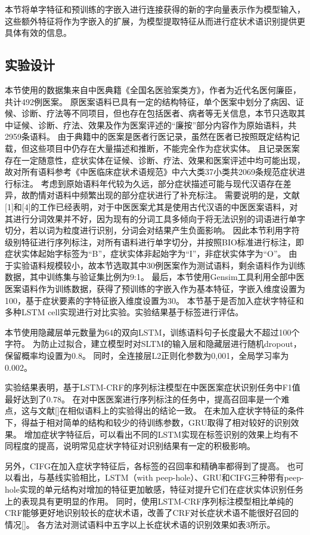 本节将单字特征和预训练的字嵌入进行连接获得的新的字向量表示作为模型输入，这些额外特征将作为字嵌入的扩展，为模型提取特征从而进行症状术语识别提供更具体有效的信息。


\subsection{实验设计}
本节使用的数据集来自中医典籍《全国名医验案类方》，作者为近代名医何廉臣，共计492例医案。
原医案语料已具有一定的结构特征，单个医案中划分了病因、证候、诊断、疗法等不同项目，但也存在包括医者、病者等无关信息，本节只选取其中证候、诊断、疗法、效果及作为医案评述的“廉按”部分内容作为原始语料，共2959条语料。
由于典籍中的医案是医者行医记录，虽然在医者已按照既定结构记载，但这些项目中仍存在大量描述和推断，不能完全作为症状实体。
且记录医案存在一定随意性，症状实体在证候、诊断、疗法、效果和医案评述中均可能出现，故对所有语料参考《中医临床症状术语规范》中六大类37小类共2069条规范症状进行标注。
考虑到原始语料年代较为久远，部分症状描述可能与现代汉语存在差异，故酌情对语料中频繁出现的部分症状进行了补充标注。
需要说明的是，文献[1]和[4]的工作已经表明，对于中医医案尤其是使用古代汉语的中医医案语料，对其进行分词效果并不好，因为现有的分词工具多倾向于将无法识别的词语进行单字切分，若以词为粒度进行识别，分词会对结果产生负面影响。
因此本节利用字符级别特征进行序列标注，对所有语料进行单字切分，并按照BIO标准进行标注，即症状实体起始字标签为“B”，症状实体非起始字为“I”，非症状实体字为“O”。
由于实验语料规模较小，故本节选取其中30例医案作为测试语料，剩余语料作为训练数据，其中训练集与验证集比例为9:1。
最后，本节使用Gensim工具利用全部中医医案语料作为训练数据，获得了预训练的字嵌入作为基本特征，字嵌入维度设置为100，基于症状要素的字特征嵌入维度设置为30。
本节基于是否加入症状字特征和多种LSTM cell实现进行对比实验。实验结果基于标签进行评估。

本节使用隐藏层单元数量为64的双向LSTM，训练语料句子长度最大不超过100个字符。
为防止过拟合，建立模型时对SLTM的输入层和隐藏层进行随机dropout，保留概率均设置为0.8。
同时，全连接层L2正则化参数为0,001，全局学习率为0.002。

实验结果表明，基于LSTM-CRF的序列标注模型在中医医案症状识别任务中F1值最好达到了0.78。
在对中医医案进行序列标注的任务中，提高召回率是一个难点，这与文献[]在相似语料上的实验得出的结论一致。
在未加入症状字特征的条件下，得益于相对简单的结构和较少的待训练参数，GRU取得了相对较好的识别效果。
增加症状字特征后，可以看出不同的LSTM实现在标签识别的效果上均有不同程度的提高，说明常见症状字特征对识别结果有一定的积极影响。

另外，CIFG在加入症状字特征后，各标签的召回率和精确率都得到了提高。
也可以看出，与基线实验相比，LSTM（with peep-hole）、GRU和CIFG三种带有peep-hole实现的单元结构对增加的特征更加敏感，特征对提升它们在症状实体识别任务上的表现具有更明显的作用。
同时，使用LSTM-CRF序列标注模型相比单纯的CRF能够更好地识别较长的症状术语，改善了CRF对长症状术语不能很好召回的情况[]。
各方法对测试语料中五字以上长症状术语的识别效果如表3所示。


